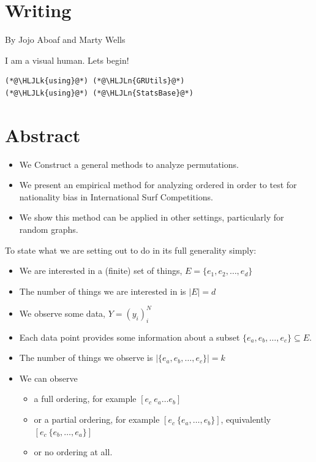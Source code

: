 \documentclass[12pt,a4paper]{article}
\newcommand{\HLJLk}[1]{\textcolor[RGB]{148,91,176}{\textbf{#1}}}
\newcommand{\HLJLn}[1]{#1}
\begin{document}
\section{Writing}
By Jojo Aboaf and Marty Wells

I am a visual human. Lets begin!


\begin{lstlisting}
(*@\HLJLk{using}@*) (*@\HLJLn{GRUtils}@*)
(*@\HLJLk{using}@*) (*@\HLJLn{StatsBase}@*)
\end{lstlisting}


\section{Abstract}
\begin{itemize}
\item We Construct a general methods to analyze permutations.


\item We present an empirical method for analyzing ordered in order to test for nationality bias in International Surf Competitions.


\item We show this method can be applied in other settings, particularly for random graphs.

\end{itemize}

To state what we are setting out to do in its full generality simply:

\begin{itemize}
\item We are interested in a (finite) set of things, $E = \{e_1, e_2, \dots, e_d \}$


\item The number of things we are interested in is $|E|=d$


\item We observe some data, $Y = (y_i)_i^N$


\item Each data point provides some information about a subset $\{e_a, e_b,\ensuremath{\ldots}, e_c \} \ensuremath{\subseteq} E$.


\item The number of things we observe is $|\{e_a, e_b,\ensuremath{\ldots}, e_c \} | = k$


\item We can observe

\begin{itemize}
\item a full ordering, for example $[e_c \:  e_a \ensuremath{\ldots} e_b]$


\item or a partial ordering, for example $[e_c \: \{e_a, \ensuremath{\ldots}, e_b\}]$, equivalently $[e_c \: \{e_b, \ensuremath{\ldots}, e_a\}]$


\item or no ordering at all.

\end{itemize}
\end{itemize}
\end{document}
